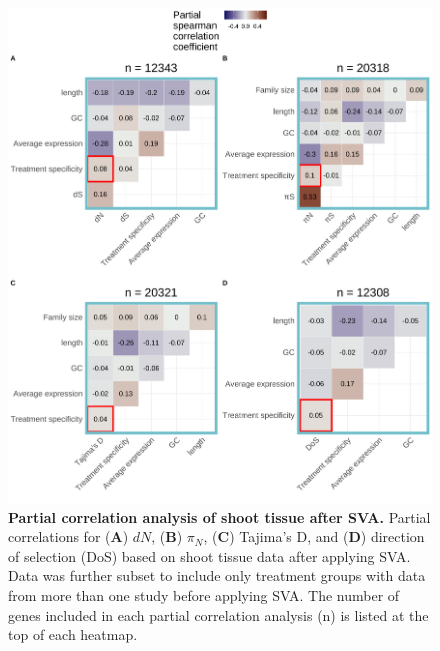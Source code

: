\documentclass[12pt]{article}
\begin{document}
\begin{figure}[H]
\includegraphics[width=\linewidth, height=\textheight, keepaspectratio]{figures/appendix_a/partialCorrelations_withoutTissueSpecificityAfterSVA_shoot_2023-02-21.pdf}
\caption{\textbf{Partial correlation analysis of shoot tissue after SVA.} Partial correlations for (\textbf{A}) $dN$, (\textbf{B}) $\pi_N$, (\textbf{C}) Tajima's D, and (\textbf{D}) direction of selection (DoS) based on shoot tissue data after applying SVA. Data was further subset to include only treatment groups with data from more than one study before applying SVA. The number of genes included in each partial correlation analysis (n) is listed at the top of each heatmap.}%
\end{figure}

\newpage
\end{document}
